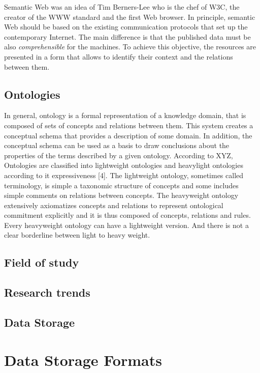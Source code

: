 Semantic Web was an idea of Tim Berners-Lee who is the chef of W3C, the creator
of the WWW standard and the first Web browser. In principle, semantic Web should
be based on the existing communication protocols that set up the contemporary
Internet. The main difference is that the published data must be also
\textit{comprehensible} for the machines. To achieve this objective, the
resources are presented in a form that allows to identify their context
and the relations between them.

\subsection{Ontologies}
\label{sec:Ontology}
In general, ontology is a formal representation of a knowledge domain, that
is composed of sets of concepts and relations between them. This system creates
a conceptual schema that provides a description of some domain. In addition,
the conceptual schema can be used as a basis to draw conclusions about the
properties of the terms described by a given ontology. According to
XYZ, Ontologies are classified into lightweight ontologies and heavylight
ontologies according to it expressiveness [4]. The lightweight ontology, sometimes
called terminology, is simple a taxonomic structure of concepts
and some includes simple comments on relations between
concepts. The heavyweight ontology extensively axiomatizes
concepts and relations to represent ontological commitment
explicitly and it is thus composed of concepts, relations and
rules. Every heavyweight ontology can have a lightweight
version. And there is not a clear borderline between light to
heavy weight.


\subsection{Field of study}

\subsection{Research trends}

\subsection{Data Storage}

\section{Data Storage Formats}
